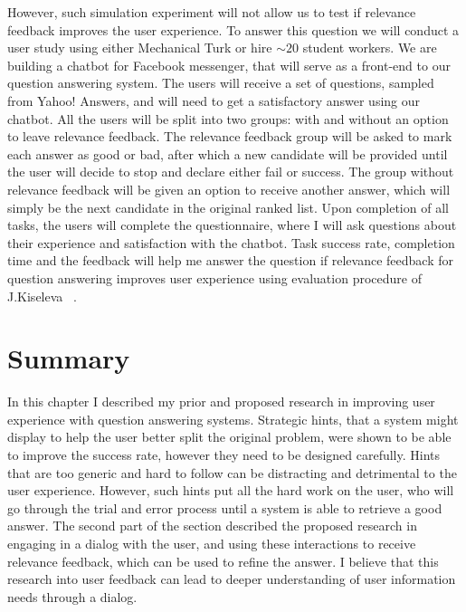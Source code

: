 However, such simulation experiment will not allow us to test if relevance feedback improves the user experience.
To answer this question we will conduct a user study using either Mechanical Turk or hire $\sim 20$ student workers.
We are building a chatbot for Facebook messenger, that will serve as a front-end to our question answering system.
The users will receive a set of questions, \eg sampled from Yahoo! Answers, and will need to get a satisfactory answer using our chatbot.
All the users will be split into two groups: with and without an option to leave relevance feedback.
The relevance feedback group will be asked to mark each answer as good or bad, after which a new candidate will be provided until the user will decide to stop and declare either fail or success.
The group without relevance feedback will be given an option to receive another answer, which will simply be the next candidate in the original ranked list.
Upon completion of all tasks, the users will complete the questionnaire, where I will ask questions about their experience and satisfaction with the chatbot.
Task success rate, completion time and the feedback will help me answer the question if relevance feedback for question answering improves user experience using evaluation procedure of J.Kiseleva \etal~\cite{kiseleva2016understanding}.

\section{Summary}
\label{section:users:summary}

In this chapter I described my prior and proposed research in improving user experience with question answering systems.
Strategic hints, that a system might display to help the user better split the original problem, were shown to be able to improve the success rate, however they need to be designed carefully.
Hints that are too generic and hard to follow can be distracting and detrimental to the user experience.
However, such hints put all the hard work on the user, who will go through the trial and error process until a system is able to retrieve a good answer.
The second part of the section described the proposed research in engaging in a dialog with the user, and using these interactions to receive relevance feedback, which can be used to refine the answer.
I believe that this research into user feedback can lead to deeper understanding of user information needs through a dialog.
